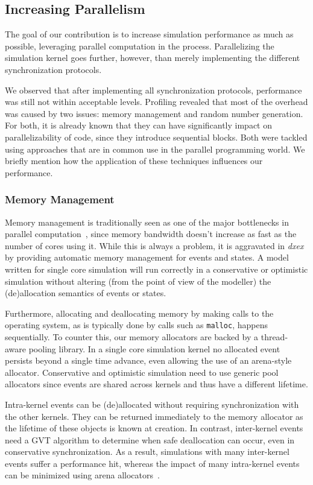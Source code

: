 \subsection{Increasing Parallelism}
The goal of our contribution is to increase simulation performance as much as possible, leveraging parallel computation in the process.
Parallelizing the simulation kernel goes further, however, than merely implementing the different synchronization protocols.

We observed that after implementing all synchronization protocols, performance was still not within acceptable levels.
Profiling revealed that most of the overhead was caused by two issues: memory management and random number generation.
For both, it is already known that they can have significantly impact on parallelizability of code, since they introduce sequential blocks.
Both were tackled using approaches that are in common use in the parallel programming world.
We briefly mention how the application of these techniques influences our performance.

\subsubsection{Memory Management}
\label{sec:4-subsec:overhead-pgraph:memory}
Memory management is traditionally seen as one of the major bottlenecks in parallel computation~\cite{Memory}, since memory bandwidth doesn't increase as fast as the number of cores using it.
While this is always a problem, it is aggravated in \textit{dxex} by providing automatic memory management for events and states.
A model written for single core simulation will run correctly in a conservative or optimistic simulation without altering (from the point of view of the modeller) the (de)allocation semantics of events or states.

Furthermore, allocating and deallocating memory by making calls to the operating system, as is typically done by calls such as \texttt{malloc}, happens sequentially.
To counter this, our memory allocators are backed by a thread-aware pooling library.
In a single core simulation kernel no allocated event persists beyond a single time advance, even allowing the use of an arena-style allocator.
Conservative and optimistic simulation need to use generic pool allocators since events are shared across kernels and thus have a different lifetime.

Intra-kernel events can be (de)allocated without requiring synchronization with the other kernels. 
They can be returned immediately to the memory allocator as the lifetime of these objects is known at creation.
In contrast, inter-kernel events need a GVT algorithm to determine when safe deallocation can occur, even in conservative synchronization.
As a result, simulations with many inter-kernel events suffer a performance hit, whereas the impact of many intra-kernel events can be minimized using arena allocators~\cite{Arena}.

